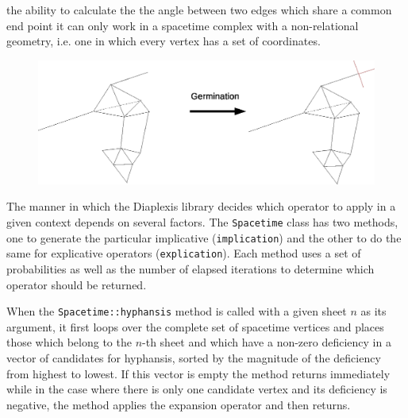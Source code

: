 \documentclass[12pt,letterpaper]{report}
\begin{document}
the ability to calculate the the angle between two edges which share a common end point it can only work 
in a spacetime complex with a non-relational geometry, i.e. one in which every vertex has a set of 
coordinates. 
\begin{figure}[htp]
\centering
\label{expl_final2}
\includegraphics[width=5in]{images/germination.eps} 
\end{figure}
 
The manner in which the Diaplexis library decides which operator to apply in a given context depends on 
several factors. The \texttt{Spacetime} class has two methods, one to generate the particular implicative 
(\texttt{implication}) and the other to do the same for explicative operators (\texttt{explication}). Each 
method uses a set of probabilities as well as the number of elapsed iterations to determine which 
operator should be returned. 

When the \texttt{Spacetime::hyphansis} method is called with a given sheet $n$ as its argument, it first 
loops over the complete set of spacetime vertices and places those which belong to the $n$-th sheet
and which have a non-zero deficiency in a vector of candidates for hyphansis, sorted by the magnitude of 
the deficiency from highest to lowest. If this vector is empty the method returns immediately while in the 
case where there is only one candidate vertex and its deficiency is negative, the method applies the 
expansion operator and then returns.
\end{document}
